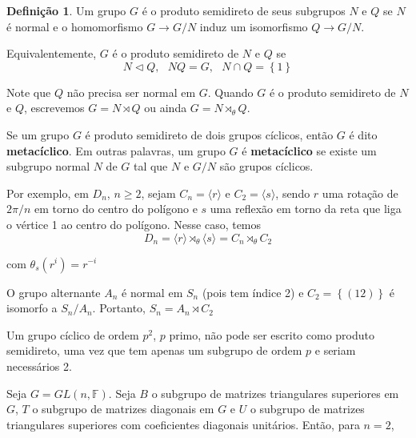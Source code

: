 \documentclass[a4paper,portuguese,11pt,twoside, leqno]{book}
\theoremstyle{definition}
\newtheorem{deff}{Definição}[section]
\begin{document}
	\begin{deff}
		\label{produto semidireto}
		Um grupo $G$ é o produto semidireto de seus subgrupos $N$ e $Q$ se $N$ é normal e o homomorfismo $G\to G/N$ induz um isomorfismo $Q\to G/N$.
		\par Equivalentemente, $G$ é o produto semidireto de $N$ e $Q$ se
		\begin{equation*}
		N\vartriangleleft Q, \text{ }NQ = G,\text{ }N\cap Q=\left\{1\right\}
		\end{equation*}
	\end{deff}
	\par\vspace{0.3cm} Note que $Q$ não precisa ser normal em $G$. Quando $G$ é o produto semidireto de $N$ e $Q$, escrevemos $G = N \rtimes Q$ ou ainda $G = N\rtimes_{\theta} Q$.
	\par\vspace{0.3cm} Se um grupo $G$ é produto semidireto de dois grupos cíclicos, então $G$ é dito \textbf{metacíclico}. Em outras palavras, um grupo $G$ é \textbf{metacíclico} se existe um subgrupo normal $N$ de $G$ tal que $N$ e $G/N$ são grupos cíclicos.
	\par\vspace{0.3cm} Por exemplo, em $D_n$, $n\geq2$, sejam $C_n = \langle r \rangle$ e $C_2 = \langle s \rangle$, sendo $r$ uma rotação de $2\pi/n$ em torno do centro do polígono e $s$ uma reflexão em torno da reta que liga o vértice 1 ao centro do polígono. Nesse caso, temos
	\begin{equation*}
	D_n = \langle r \rangle \rtimes_{\theta} \langle s \rangle = C_n\rtimes_{\theta}C_2
	\end{equation*}
	\par\vspace{0.3cm} com $\theta_s(r^i) = r^{-i}$
	\par\vspace{0.3cm} O grupo alternante $A_n$ é normal em $S_n$ (pois tem índice 2) e $C_2 = \left\{ (12) \right\}$ é isomorfo a $S_n/A_n$. Portanto, $S_n = A_n\rtimes C_2$
	\par\vspace{0.3cm} Um grupo cíclico de ordem $p^2$, $p$ primo, não pode ser escrito como produto semidireto, uma vez que tem apenas um subgrupo de ordem $p$ e seriam necessários 2.
	\par\vspace{0.3cm} Seja $G = GL(n,\mathbb{F})$. Seja $B$ o subgrupo de matrizes triangulares superiores em $G$, $T$ o subgrupo de matrizes diagonais em $G$ e $U$ o subgrupo de matrizes triangulares superiores com coeficientes diagonais unitários. Então, para $n=2$,
\end{document}
